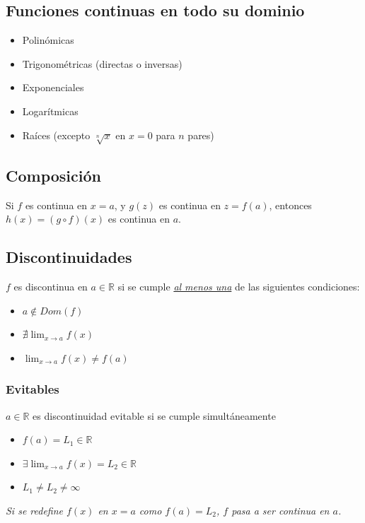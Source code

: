 \documentclass[11pt,titlepage]{article}
\newcommand{\commLim}[2]{\lim_{#1 \to #2}}
\newcommand{\displayLim}[2]{\displaystyle \commLim{#1}{#2}}
\begin{document}
\subsection{Funciones continuas en todo su dominio}
\begin{multicols}{2}
	\begin{itemize}
		\item Polinómicas
		\item Trigonométricas (directas o inversas)
		\item Exponenciales
		\item Logarítmicas
		\item Raíces (excepto $\sqrt[n]{x}$ en $x = 0$ para $n$ pares)
	\end{itemize}
\end{multicols}

\subsection{Composición}
Si $f$ es continua en $x=a$, y $g(z)$ es continua en $z=f(a)$, entonces $h(x) = (g\circ f)(x)$ es continua en $a$.

\subsection{Discontinuidades}
$f$ es discontinua en $a \in \mathbb{R}$ si se cumple \underline{\emph{al menos una}} de las siguientes condiciones:
\begin{itemize}
	\item $a \notin Dom(f)$
	\item $\nexists \commLim{x}{a} f(x)$ 
	\item $\commLim{x}{a} f(x) \neq f(a)$ 
\end{itemize}

\subsubsection{Evitables}
$a \in \mathbb{R}$ es discontinuidad evitable si se cumple simultáneamente
\begin{multicols}{3}
	\begin{itemize}
		\item $f(a) = L_1 \in \mathbb{R}$
		\item $\exists \displayLim{x}{a} f(x) = L_2 \in \mathbb{R}$
		\item $L_1 \neq L_2 \neq \infty$
	\end{itemize}
\end{multicols}
\emph{Si se redefine $f(x)$ en $x = a$ como $f(a) = L_2$, $f$ pasa a ser continua en $a$.}
\end{document}
